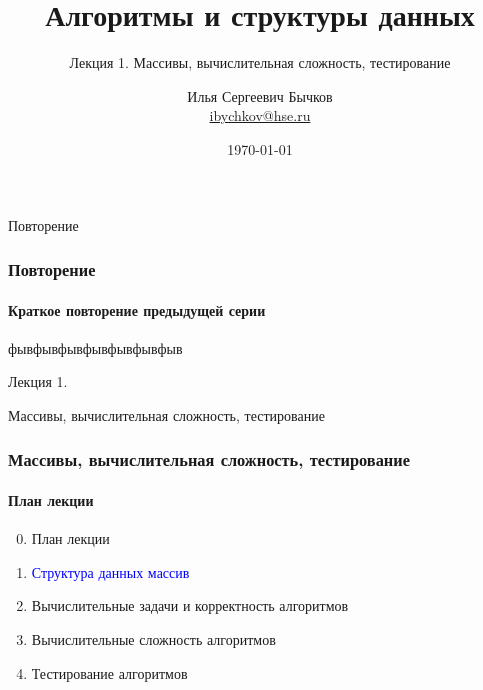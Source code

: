 \documentclass[aspectratio=169]{beamer}
\title[Title]{Алгоритмы и структуры данных}
\subtitle{Лекция 1. Массивы, вычислительная сложность, тестирование}
\author[Author's name]{Илья Сергеевич Бычков\\ \smallskip \scriptsize \url{ibychkov@hse.ru}}
\institute{НИУ ВШЭ - Нижний Новгород}
\date{\today}
\begin{document}
\frame[plain]{\titlepage}


\begin{frame}[c]

\begin{center}
\Huge Повторение
\end{center}

\end{frame}


\begin{frame}
\frametitle{Повторение}
\framesubtitle{Краткое повторение предыдущей серии}
фывфывфывфывфывфывфыв
\end{frame}

\begin{frame}[c]

\begin{center}
\Huge Лекция 1.

\Huge Массивы, вычислительная сложность, тестирование
\end{center}

\end{frame}

\begin{frame}
\frametitle{Массивы, вычислительная сложность, тестирование}
\framesubtitle{План лекции}

\begin{enumerate}
  \setcounter{enumi}{-1}
  \item{План лекции}
  \item{\textcolor{blue}{Структура данных массив}}
  \item{Вычислительные задачи и корректность алгоритмов}
  \item{Вычислительные сложность алгоритмов}
  \item{Тестирование алгоритмов}
\end{enumerate}
\end{frame}
\end{document}
